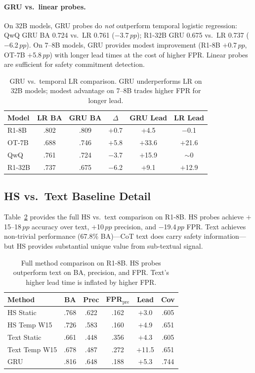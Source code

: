 \documentclass[11pt,a4paper]{article}
\newcommand{\pp}{\,pp}
\begin{document}
\paragraph{GRU vs.\ linear probes.}
On 32B models, GRU probes do \emph{not} outperform temporal logistic regression: QwQ GRU BA 0.724 vs.\ LR 0.761 ($-$3.7$\pp$); R1-32B GRU 0.675 vs.\ LR 0.737 ($-$6.2$\pp$).
On 7--8B models, GRU provides modest improvement (R1-8B $+$0.7$\pp$, OT-7B $+$5.8$\pp$) with longer lead times at the cost of higher FPR.
Linear probes are sufficient for safety commitment detection.

\begin{table}[t]
\centering
\small
\begin{tabular}{lccccc}
\toprule
\textbf{Model} & \textbf{LR BA} & \textbf{GRU BA} & \textbf{$\Delta$} & \textbf{GRU Lead} & \textbf{LR Lead} \\
\midrule
R1-8B & .802 & .809 & $+$0.7 & $+$4.5 & $-$0.1 \\
OT-7B & .688 & .746 & $+$5.8 & $+$33.6 & $+$21.6 \\
QwQ & .761 & .724 & $-$3.7 & $+$15.9 & $\sim$0 \\
R1-32B & .737 & .675 & $-$6.2 & $+$9.1 & $+$12.9 \\
\bottomrule
\end{tabular}
\caption{GRU vs.\ temporal LR comparison. GRU underperforms LR on 32B models; modest advantage on 7--8B trades higher FPR for longer lead.}
\label{tab:gru_vs_lr}
\end{table}


\subsection{HS vs.\ Text Baseline Detail}
\label{sec:text_baseline}

Table~\ref{tab:hs_text_detail} provides the full HS vs.\ text comparison on R1-8B.
HS probes achieve $+$15--18$\pp$ accuracy over text, $+$10$\pp$ precision, and $-$19.4$\pp$ FPR.
Text achieves non-trivial performance (67.8\% BA)---CoT text does carry safety information---but HS provides substantial unique value from sub-textual signal.

\begin{table}[t]
\centering
\small
\begin{tabular}{lccccc}
\toprule
\textbf{Method} & \textbf{BA} & \textbf{Prec} & \textbf{FPR$_\text{pre}$} & \textbf{Lead} & \textbf{Cov} \\
\midrule
HS Static & .768 & .622 & .162 & $+$3.0 & .605 \\
HS Temp W15 & .726 & .583 & .160 & $+$4.9 & .651 \\
Text Static & .661 & .448 & .356 & $+$4.3 & .605 \\
Text Temp W15 & .678 & .487 & .272 & $+$11.5 & .651 \\
GRU & .816 & .648 & .188 & $+$5.3 & .744 \\
\bottomrule
\end{tabular}
\caption{Full method comparison on R1-8B. HS probes outperform text on BA, precision, and FPR. Text's higher lead time is inflated by higher FPR.}
\label{tab:hs_text_detail}
\end{table}
\end{document}
